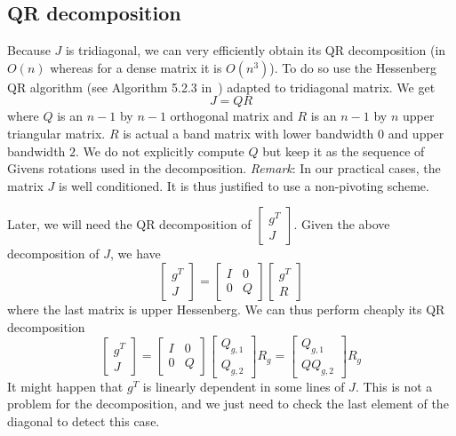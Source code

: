 \documentclass[]{article}
\newcommand{\BIN}{\begin{bmatrix}}
\newcommand{\BOUT}{\end{bmatrix}}
\begin{document}
\subsection{QR decomposition}
Because $J$ is tridiagonal, we can very efficiently obtain its QR decomposition (in $O(n)$ whereas for a dense matrix it is $O(n^3)$). To do so use the Hessenberg QR algorithm (see Algorithm 5.2.3 in~\cite{golub:book:1996}) adapted to tridiagonal matrix. We get
\begin{equation}
  J = Q R
\end{equation}
where $Q$ is an $n-1$ by $n-1$ orthogonal matrix and $R$ is an $n-1$ by $n$ upper triangular matrix. $R$ is actual a band matrix with lower bandwidth $0$ and upper bandwidth $2$. We do not explicitly compute $Q$ but keep it as the sequence of Givens rotations used in the decomposition. \newline
\emph{Remark}: In our practical cases, the matrix $J$ is well conditioned. It is thus justified to use a non-pivoting scheme.

Later, we will need the QR decomposition of $\BIN g^T \\ J \BOUT$. Given the above decomposition of $J$, we have
\begin{equation}
  \BIN g^T \\ J \BOUT = \BIN I & 0 \\ 0 & Q \BOUT \BIN g^T \\ R \BOUT
\end{equation}
where the last matrix is upper Hessenberg. We can thus perform cheaply its QR decomposition
\begin{equation}
  \BIN g^T \\ J \BOUT = \BIN I & 0 \\ 0 & Q \BOUT \BIN Q_{g,1} \\ Q_{g,2} \BOUT R_g = \BIN Q_{g,1} \\ Q Q_{g,2} \BOUT R_g
\end{equation}
It might happen that $g^T$ is linearly dependent in some lines of $J$. This is not a problem for the decomposition, and we just need to check the last element of the diagonal to detect this case.
\end{document}
